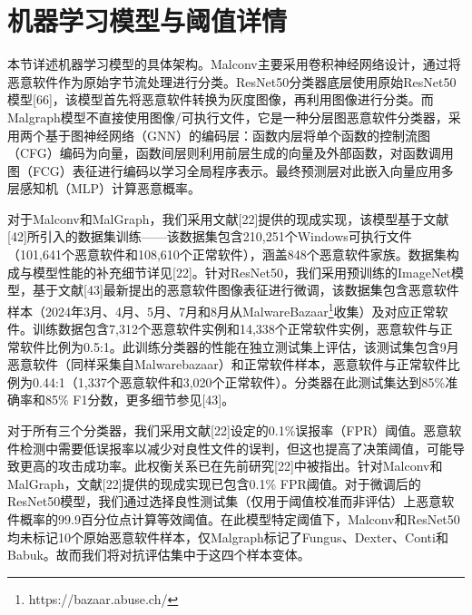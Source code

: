 \chapter{机器学习模型与阈值详情}

本节详述机器学习模型的具体架构。Malconv主要采用卷积神经网络设计，通过将恶意软件作为原始字节流处理进行分类。ResNet50分类器底层使用原始ResNet50模型[66]，该模型首先将恶意软件转换为灰度图像，再利用图像进行分类。而Malgraph模型不直接使用图像/可执行文件，它是一种分层图恶意软件分类器，采用两个基于图神经网络（GNN）的编码层：函数内层将单个函数的控制流图（CFG）编码为向量，函数间层则利用前层生成的向量及外部函数，对函数调用图（FCG）表征进行编码以学习全局程序表示。最终预测层对此嵌入向量应用多层感知机（MLP）计算恶意概率。

对于Malconv和MalGraph，我们采用文献[22]提供的现成实现，该模型基于文献[42]所引入的数据集训练——该数据集包含210,251个Windows可执行文件（101,641个恶意软件和108,610个正常软件），涵盖848个恶意软件家族。数据集构成与模型性能的补充细节详见[22]。针对ResNet50，我们采用预训练的ImageNet模型，基于文献[43]最新提出的恶意软件图像表征进行微调，该数据集包含恶意软件样本（2024年3月、4月、5月、7月和8月从MalwareBazaar\footnote{https://bazaar.abuse.ch/}收集）及对应正常软件。训练数据包含7,312个恶意软件实例和14,338个正常软件实例，恶意软件与正常软件比例为0.5:1。此训练分类器的性能在独立测试集上评估，该测试集包含9月恶意软件（同样采集自Malwarebazaar）和正常软件样本，恶意软件与正常软件比例为0.44:1（1,337个恶意软件和3,020个正常软件）。分类器在此测试集达到85\%准确率和85\% F1分数，更多细节参见[43]。

对于所有三个分类器，我们采用文献[22]设定的0.1\%误报率（FPR）阈值。恶意软件检测中需要低误报率以减少对良性文件的误判，但这也提高了决策阈值，可能导致更高的攻击成功率。此权衡关系已在先前研究[22]中被指出。针对Malconv和MalGraph，文献[22]提供的现成实现已包含0.1\% FPR阈值。对于微调后的ResNet50模型，我们通过选择良性测试集（仅用于阈值校准而非评估）上恶意软件概率的99.9百分位点计算等效阈值。在此模型特定阈值下，Malconv和ResNet50均未标记10个原始恶意软件样本，仅Malgraph标记了Fungus、Dexter、Conti和Babuk。故而我们将对抗评估集中于这四个样本变体。